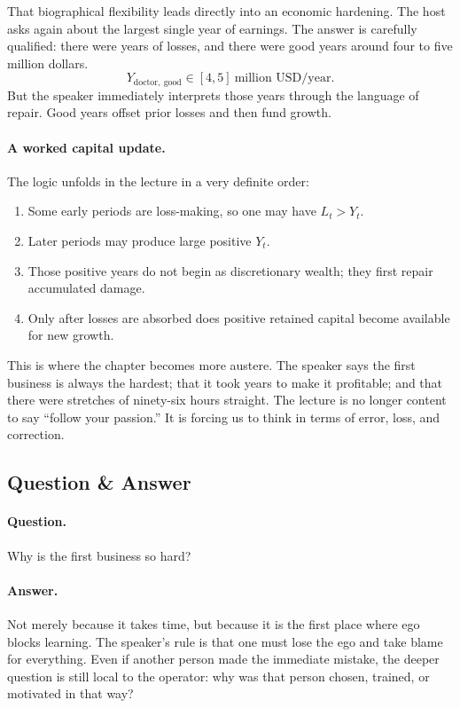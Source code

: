 That biographical flexibility leads directly into an economic hardening. The host asks again about the largest single year of earnings. The answer is carefully qualified: there were years of losses, and there were good years around four to five million dollars.
\begin{equation}
Y_{\mathrm{doctor,\ good}} \in [4,5]\ \text{million USD/year}.
\end{equation}
But the speaker immediately interprets those years through the language of repair. Good years offset prior losses and then fund growth.

\paragraph{A worked capital update.} The logic unfolds in the lecture in a very definite order:
\begin{enumerate}
\item Some early periods are loss-making, so one may have \(L_t > Y_t\).
\item Later periods may produce large positive \(Y_t\).
\item Those positive years do not begin as discretionary wealth; they first repair accumulated damage.
\item Only after losses are absorbed does positive retained capital become available for new growth.
\end{enumerate}

This is where the chapter becomes more austere. The speaker says the first business is always the hardest; that it took years to make it profitable; and that there were stretches of ninety-six hours straight. The lecture is no longer content to say ``follow your passion.'' It is forcing us to think in terms of error, loss, and correction.

\subsection{Question \& Answer}

\paragraph{Question.} Why is the first business so hard?

\paragraph{Answer.} Not merely because it takes time, but because it is the first place where ego blocks learning. The speaker's rule is that one must lose the ego and take blame for everything. Even if another person made the immediate mistake, the deeper question is still local to the operator: why was that person chosen, trained, or motivated in that way?

